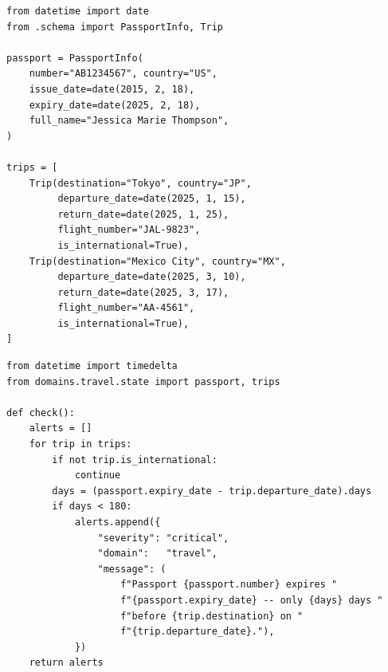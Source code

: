 \begin{lstlisting}[caption={Excerpt from \texttt{domains/travel/state.py} of a UaC user project. Generated automatically from the append-only fact list.}, label={lst:travel-state}]
from datetime import date
from .schema import PassportInfo, Trip

passport = PassportInfo(
    number="AB1234567", country="US",
    issue_date=date(2015, 2, 18),
    expiry_date=date(2025, 2, 18),
    full_name="Jessica Marie Thompson",
)

trips = [
    Trip(destination="Tokyo", country="JP",
         departure_date=date(2025, 1, 15),
         return_date=date(2025, 1, 25),
         flight_number="JAL-9823",
         is_international=True),
    Trip(destination="Mexico City", country="MX",
         departure_date=date(2025, 3, 10),
         return_date=date(2025, 3, 17),
         flight_number="AA-4561",
         is_international=True),
]
\end{lstlisting}

\begin{lstlisting}[caption={Excerpt from \texttt{constraints/travel\_readiness.py}. The constraint reads the typed state and returns structured alerts. The interpreter runs it deterministically; no LLM is required at check time.}, label={lst:constraint}]
from datetime import timedelta
from domains.travel.state import passport, trips

def check():
    alerts = []
    for trip in trips:
        if not trip.is_international:
            continue
        days = (passport.expiry_date - trip.departure_date).days
        if days < 180:
            alerts.append({
                "severity": "critical",
                "domain":   "travel",
                "message": (
                    f"Passport {passport.number} expires "
                    f"{passport.expiry_date} -- only {days} days "
                    f"before {trip.destination} on "
                    f"{trip.departure_date}."),
            })
    return alerts
\end{lstlisting}

